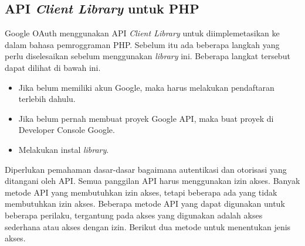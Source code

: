 \subsection{API {\it Client Library} untuk PHP \cite{Lib:2015}}
Google OAuth menggunakan API {\it Client Library} untuk diimplemetasikan ke dalam bahasa pemroggraman PHP. Sebelum itu ada beberapa langkah yang perlu diselesaikan sebelum menggunakan {\it library} ini. Beberapa langkat tersebut dapat dilihat di bawah ini.

\begin{itemize}
\item Jika belum memiliki akun Google, maka harus melakukan pendaftaran terlebih dahulu.
\item Jika belum pernah membuat proyek Google API, maka buat proyek di Developer Console Google.
\item Melakukan instal {\it library}.
\end{itemize}

Diperlukan pemahaman dasar-dasar bagaimana autentikasi dan otorisasi yang ditangani oleh API. Semua panggilan API harus menggunakan izin akses. Banyak metode API yang membutuhkan izin akses, tetapi beberapa ada yang tidak membutuhkan izin akses. Beberapa metode API yang dapat digunakan untuk beberapa perilaku, tergantung pada akses yang digunakan adalah akses sederhana atau akses dengan izin. Berikut dua metode untuk menentukan jenis akses.

